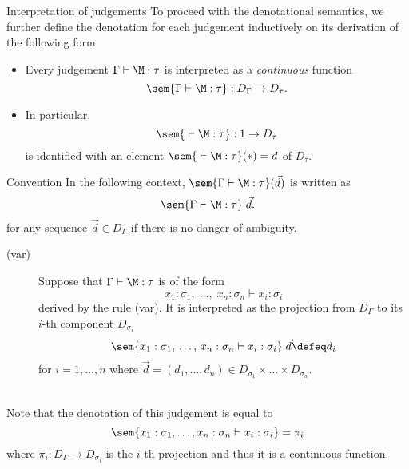 \begin{frame}{Interpretation of judgements}
  To proceed with the denotational semantics, we further define
  the denotation for each judgement inductively on its derivation
  of the following form
  \begin{itemize}
    \item Every judgement $\Gamma \vdash \M : \tau$ is interpreted as a
      \emph{continuous} function
      \[
        \sem{\Gamma \vdash \M : \tau} : D_\Gamma \to D_{\tau}.
      \] 
    \item In particular, 
      \[
        \sem{ {} \vdash \M : \tau} : 1 \to D_\tau
      \]
      is identified 
      with an element $\sem{{}\vdash \M : \tau}(*) = d$ of $D_\tau$.
  \end{itemize}
  \begin{block}{Convention}
    In the following context, $\sem{\Gamma \vdash \M : \tau}(\vec{d})$
    is written as
    \[
      \sem{\Gamma \vdash \M : \tau}\;\vec{d}.
    \]
    for any sequence $\vec{d} \in D_\Gamma$ if there is no danger of ambiguity. 
  \end{block}
\end{frame}
\begin{frame}
  \begin{description}
    \item[(var)] 
      Suppose that $\Gamma \vdash \M : \tau$ is of the form
      \[
        x_1 : \sigma_1,\;\ldots,\; x_n : \sigma_n \vdash x_i : \sigma_i
      \]
      derived by the rule (var).  It is interpreted as the projection
      from $D_\Gamma$ to its $i$-th component $D_{\sigma_i}$
      \[
        \sem{x_1 : \sigma_1,\, \ldots,\, x_n : \sigma_n
          \vdash x_i : \sigma_i}\;\vec{d}  \defeq d_i
      \]
      for $i = 1,\ldots,n$ where $\vec{d} = (d_1, \ldots, d_n) \in D_{\sigma_1}
      \times \dots \times D_{\sigma_n}$.
  \end{description}
  ~\\
  Note that the denotation of this judgement is equal to 
  \[
    \sem{x_1 : \sigma_1, \ldots, x_n:\sigma_n \vdash x_i:\sigma_i}
    = \pi_i 
  \]
  where $\pi_i \colon D_\Gamma \to D_{\sigma_i}$ is the $i$-th projection
  and thus it is a continuous function. 

\end{frame}

